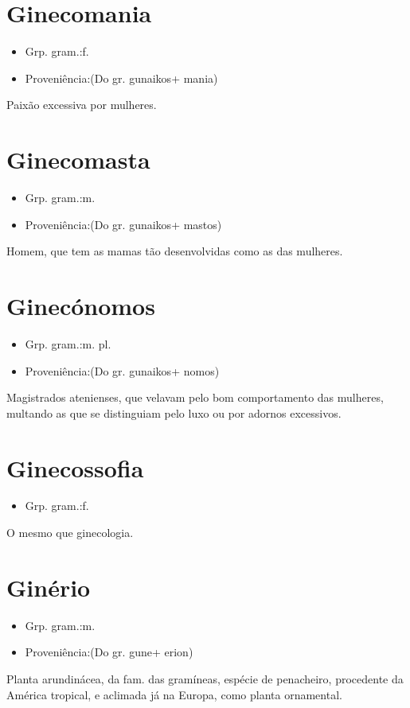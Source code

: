 \section{Ginecomania}
\begin{itemize}
\item {Grp. gram.:f.}
\end{itemize}
\begin{itemize}
\item {Proveniência:(Do gr. \textunderscore gunaikos\textunderscore  + \textunderscore mania\textunderscore )}
\end{itemize}
Paixão excessiva por mulheres.
\section{Ginecomasta}
\begin{itemize}
\item {Grp. gram.:m.}
\end{itemize}
\begin{itemize}
\item {Proveniência:(Do gr. \textunderscore gunaikos\textunderscore  + \textunderscore mastos\textunderscore )}
\end{itemize}
Homem, que tem as mamas tão desenvolvidas como as das mulheres.
\section{Ginecónomos}
\begin{itemize}
\item {Grp. gram.:m. pl.}
\end{itemize}
\begin{itemize}
\item {Proveniência:(Do gr. \textunderscore gunaikos\textunderscore  + \textunderscore nomos\textunderscore )}
\end{itemize}
Magistrados atenienses, que velavam pelo bom comportamento das mulheres, multando as que se distinguiam pelo luxo ou por adornos excessivos.
\section{Ginecossofia}
\begin{itemize}
\item {Grp. gram.:f.}
\end{itemize}
O mesmo que \textunderscore ginecologia\textunderscore .
\section{Ginério}
\begin{itemize}
\item {Grp. gram.:m.}
\end{itemize}
\begin{itemize}
\item {Proveniência:(Do gr. \textunderscore gune\textunderscore  + \textunderscore erion\textunderscore )}
\end{itemize}
Planta arundinácea, da fam. das gramíneas, espécie de penacheiro, procedente da América tropical, e aclimada já na Europa, como planta ornamental.
